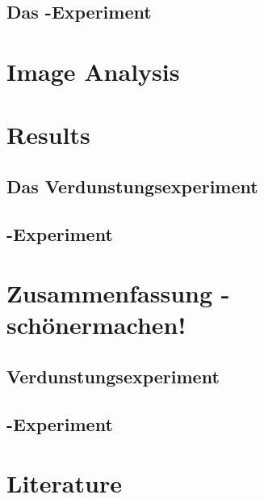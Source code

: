 \documentclass[oneside, a4paper, DIV=11]{scrartcl}
\begin{document}
\subsection{Das \COT-Experiment}
\label{set:cot}

\section{Image Analysis}
\label{sec:ima}


\section{Results}
\label{sec:res}
\subsection{Das Verdunstungsexperiment}
\label{res:eva}
\subsection{\COT-Experiment}
\label{res:cot}

\section{Zusammenfassung - schönermachen!}
\label{sec:con}
\subsection{Verdunstungsexperiment}
\label{con:eva}
\subsection{\COT-Experiment}
\label{con:cot}

\section{Literature}
\label{sec:lit}
\end{document}

